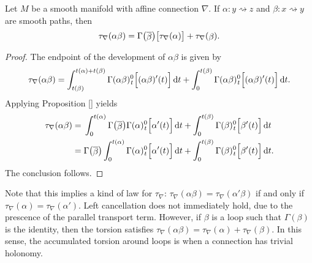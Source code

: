 \begin{proposition}
  Let $M$ be a smooth manifold with affine connection $\nabla$. If $\alpha \colon y \rightsquigarrow z$ and $\beta \colon x \rightsquigarrow y$ are smooth paths, then
  \begin{equation}
    \tau_\nabla (\alpha \beta) = \Gamma\big(\raisebox{-1pt}{$\overline{\beta}$}\big) \big[ \tau_\nabla (\alpha) \big] + \tau_\nabla(\raisebox{-1pt}{$\beta$}). 
  \end{equation}
\end{proposition}
\begin{proof}
  The endpoint of the development of $\alpha \beta$ is given by
  \begin{equation}
    \tau_\nabla(\alpha\beta) = \int_{t(\beta)}^{t(\alpha) + t(\beta)} \Gamma(\alpha \beta)_{\hspace{0.5pt}t}^0 \Big[ (\alpha \beta)'(t)\Big] \, {\rm d} t  + \int_{0}^{t(\beta)} \Gamma(\alpha \beta)_{\hspace{0.5pt}t}^0 \Big[ (\alpha \beta)'(t)\Big] \, {\rm d} t.
  \end{equation}
  Applying Proposition \ref{} yields
  \begin{align}
    \tau_\nabla(\alpha\beta) &= \,\int_{0}^{t(\alpha)} \Gamma\big(\raisebox{-1pt}{$\overline{\beta}$}\big)\Gamma(\alpha)_{\hspace{0.5pt}t}^0 \Big[ \alpha'(t)\Big] \, \d t + \int_{0}^{t(\beta)} \Gamma(\beta)_{\hspace{0.5pt}t}^0 \Big[ \beta'(t)\Big] \, \d t \\
    &= \Gamma\big(\raisebox{-1pt}{$\overline{\beta}$}\big) \int_{0}^{t(\alpha)} \Gamma(\alpha)_{\hspace{0.5pt}t}^0 \Big[ \alpha'(t)\Big] \, \d t + \int_{0}^{t(\beta)} \Gamma(\beta)_{\hspace{0.5pt}t}^0 \Big[ \beta'(t)\Big] \, \d t.
  \end{align}
  The conclusion follows.
\end{proof}

Note that this implies a kind of  law for $\tau_\nabla$: $\tau_\nabla(\alpha \beta) = \tau_\nabla(\alpha' \beta)$ if and only if $\tau_\nabla(\alpha) = \tau_\nabla(\alpha')$. Left cancellation does not immediately hold, due to the prescence of the parallel transport term. However, if $\beta$ is a loop such that $\Gamma(\beta)$ is the identity, then the torsion satisfies $\tau_\nabla(\alpha\beta) = \tau_\nabla(\alpha) + \tau_\nabla(\beta)$. In this sense, the accumulated torsion around loops is  when a connection has trivial holonomy.

